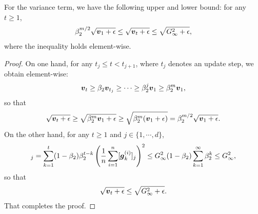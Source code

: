 \begin{lemma}
\label{lemma:var_bound}
For the variance term, we have the following upper and lower bound: for any $t \geq 1$,
\begin{align*}
    \beta_2^{m/2}\sqrt{\boldsymbol{v}_{1}+\epsilon} \leq  \sqrt{\boldsymbol{v}_t+\epsilon} \leq \sqrt{G_\infty^2+\epsilon},
\end{align*}
where the inequality holds element-wise.
\end{lemma}
\begin{proof}
On one hand, for any $t_j \leq t < t_{j+1}$, where $t_j$ denotes an update step, we obtain element-wise:
\begin{align*}
    \boldsymbol{v}_{t} \geq \beta_2\boldsymbol{v}_{t_j} \geq \cdots \geq \beta_2^j\boldsymbol{v}_{1} \geq \beta_2^m\boldsymbol{v}_{1},
\end{align*}
so that
\begin{align*}
    \sqrt{\boldsymbol{v}_t+\epsilon} \geq \sqrt{\beta_2^m\boldsymbol{v}_{1}+\epsilon} \geq \sqrt{\beta_2^m(\boldsymbol{v}_{1}+\epsilon)} = \beta_2^{m/2}\sqrt{\boldsymbol{v}_{1}+\epsilon}.
\end{align*}
On the other hand, for any $t\geq 1$ and $j\in\{1, \cdots, d\}$,
\begin{align*}
    [\*v_t]_j = \sum_{k=1}^{t}(1-\beta_2)\beta_2^{t-k}\left( \frac{1}{n}\sum_{i=1}^{n}[\*g^{(i)}_k]_j \right)^2 \leq G_\infty^2(1-\beta_2)\sum_{k=1}^{\infty}\beta_2^{k} \leq G_\infty^2,
\end{align*}
so that
\begin{align*}
    \sqrt{\boldsymbol{v}_t+\epsilon} \leq \sqrt{G_\infty^2+\epsilon}.
\end{align*}
That completes the proof.
\end{proof}

